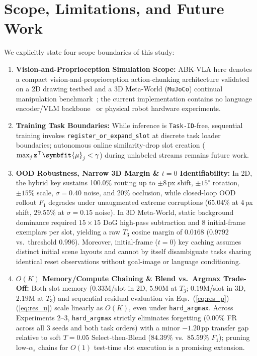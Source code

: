 \documentclass[10pt,twocolumn]{article}
\begin{document}
\section{Scope, Limitations, and Future Work}
We explicitly state four scope boundaries of this study:
\begin{enumerate}
    \item \textbf{Vision-and-Proprioception Simulation Scope:} ABK-VLA here denotes a compact vision-and-proprioception action-chunking architecture validated on a 2D drawing testbed and a 3D Meta-World (\texttt{MuJoCo}) continual manipulation benchmark~\cite{yu2020metaworld}; the current implementation contains no language encoder/VLM backbone~\cite{kim2024openvla} or physical robot hardware experiments.
    \item \textbf{Training Task Boundaries:} While inference is \texttt{Task-ID}-free, sequential training invokes \texttt{register\_or\_expand\_slot} at discrete task loader boundaries; autonomous online similarity-drop slot creation ($\max_j \mathbf{z}^\top \symbfit{\mu}_j < \gamma$) during unlabeled streams remains future work.
    \item \textbf{OOD Robustness, Narrow 3D Margin \& $t=0$ Identifiability:} In 2D, the hybrid key sustains 100.0\% routing up to $\pm 8$\,px shift, $\pm 15^\circ$ rotation, $\pm 15\%$ scale, $\sigma=0.40$ noise, and 20\% occlusion, while closed-loop OOD rollout $F_1$ degrades under unaugmented extreme corruptions ($65.04\%$ at 4\,px shift, $29.55\%$ at $\sigma=0.15$ noise). In 3D Meta-World, static background dominance required $15\times 15$ DoG high-pass subtraction and 8 initial-frame exemplars per slot, yielding a raw $T_3$ cosine margin of $0.0168$ ($0.9792$ vs.\ threshold $0.996$). Moreover, initial-frame ($t=0$) key caching assumes distinct initial scene layouts and cannot by itself disambiguate tasks sharing identical reset observations without goal-image or language conditioning.
    \item \textbf{$O(K)$ Memory/Compute Chaining \& Blend vs.\ Argmax Trade-Off:} Both slot memory ($0.33\text{M}$/slot in 2D, $5.90\text{M}$ at $T_3$; $0.19\text{M}$/slot in 3D, $2.19\text{M}$ at $T_3$) and sequential residual evaluation via Eqs.~(\ref{eq:res_p})--(\ref{eq:res_u}) scale linearly as $O(K)$, even under \texttt{hard\_argmax}. Across Experiments 2--3, \texttt{hard\_argmax} strictly eliminates forgetting ($0.00\%$ FR across all 3 seeds and both task orders) with a minor $-1.20$\,pp transfer gap relative to soft $T=0.05$ Select-then-Blend ($84.39\%$ vs.\ $85.59\%$ $F_1$); pruning low-$\alpha_s$ chains for $O(1)$ test-time slot execution is a promising extension.
\end{enumerate}
\end{document}
